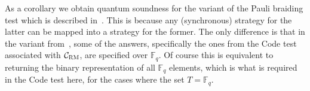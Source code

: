 \documentclass[11pt]{article}
\theoremstyle{definition}
\newcommand{\code}{\mathcal{C}}
\newcommand{\F}{\ensuremath{\mathbb{F}}}
\newcommand{\RM}{\ensuremath{\textsc{RM}}}
\begin{document}
As a corollary we obtain quantum soundness for the variant of the Pauli braiding test which is described in~\cite[Section 7.3]{ji2020mip}. This is because any (synchronous) strategy for the latter can be mapped into a strategy for the former. The only difference is that in the variant from~\cite{ji2020mip}, some of the answers, specifically the ones from the Code test associated with $\code_\RM$, are specified over $\F_q$. Of course this is equivalent to returning the binary representation of all $\F_q$ elements, which is what is required in the Code test here, for the cases where the set $T=\F_q$. 

%



\notesendofpaper
\end{document}

